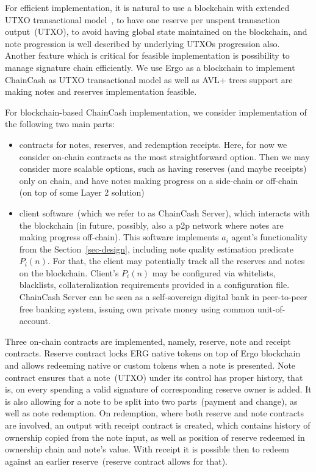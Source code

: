 \documentclass{ifcolog}
\newcommand{\cc}{ChainCash}
\begin{document}
For efficient implementation, it is natural to use a blockchain with extended UTXO transactional model~\cite{chakravarty2020extended}, to have one reserve per unspent transaction output~(UTXO), to
avoid having global state maintained on the blockchain, and note progression is well described by underlying UTXOs progression also. Another feature which is critical for feasible implementation is
possibility to manage signature chain efficiently. We use Ergo as a blockchain to implement \cc{} as UTXO transactional model as well as AVL+ trees support are making notes and reserves implementation feasible.

For blockchain-based \cc{} implementation, we consider implementation of the following two main parts:

\begin{itemize}
  \item{} contracts for notes, reserves, and redemption receipts. Here, for now we consider on-chain contracts as the most
  straightforward option. Then we may consider more scalable options, such as having reserves (and maybe receipts) only
  on chain, and have notes making progress on a side-chain or off-chain (on top of some Layer 2 solution)
  \item{} client software~(which we refer to as \cc{} Server), which interacts with the blockchain (in future, possibly, also a p2p network
  where notes are making progress off-chain). This software implements $a_i$ agent's functionality from the Section~\ref{sec-design},
  including note quality estimation predicate $P_i(n)$. For that, the client may potentially track all the reserves and notes on the blockchain.
  Client's $P_i(n)$ may be configured via whitelists, blacklists, collateralization requirements provided in a configuration file.
  \cc{} Server can be seen as a self-sovereign digital bank in peer-to-peer free banking system, issuing own private money using common unit-of-account.
\end{itemize}

Three on-chain contracts are implemented, namely, reserve, note and receipt contracts. Reserve contract locks ERG native tokens on top of Ergo blockchain and allows redeeming native or custom tokens when a note is presented. Note contract ensures that a note~(UTXO) under its control has proper history, that is, on every spending a valid signature of corresponding reserve owner is added. It is also allowing for a note to be split into two parts~(payment and change), as well as note redemption.
On redemption, where both reserve and note contracts are involved, an output with receipt contract is created, which contains history of ownership copied from the note input, as well as position of reserve redeemed in ownership chain and note's value. With receipt it is possible then to redeem against an earlier reserve~(reserve contract allows for that).
\end{document}
